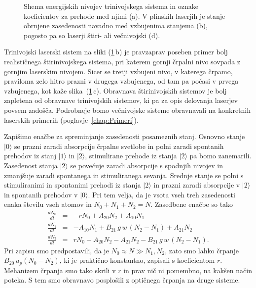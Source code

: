 \begin{figure}[h]
\centering
\def\svgwidth{130truemm} 

\caption{Shema energijskih nivojev trinivojskega sistema in oznake koeficientov za prehode
med njimi (a). V plinskih laserjih je stanje obrnjene zasedenosti navadno med vzbujenima 
stanjema (b), pogosto pa so laserji štiri- ali večnivojski (d).}
\label{fig:3nivojski}
\end{figure}
\begin{remark}
Trinivojski laserski sistem na sliki (\ref{fig:3nivojski}\,b) je pravzaprav 
poseben primer bolj realističnega štirinivojskega sistema, 
pri katerem gornji črpalni nivo sovpada z gornjim laserskim nivojem. Sicer se tretji vzbujeni nivo, 
v katerega črpamo, praviloma zelo hitro prazni v drugega vzbujenega, od tam pa počasi v prvega vzbujenega, 
kot kaže slika~(\ref{fig:3nivojski}\,c).
Obravnava štirinivojskih sistemov je bolj zapletena od obravnave trinivojskih sistemov, 
ki pa za opis delovanja laserjev povsem zadošča. Podrobneje bomo večnivojske sisteme 
obravnavali na konkretnih laserskih primerih (poglavje~\ref{chap:Primeri}).
\end{remark}

Zapišimo enačbe za spreminjanje zasedenosti posameznih stanj. Osnovno stanje
$|0\rangle$ se prazni zaradi absorpcije črpalne svetlobe in polni zaradi
spontanih prehodov iz stanj $|1\rangle$ in $|2\rangle$, stimulirane
prehode iz stanja $|2\rangle$ pa bomo zanemarili. Zasedenost stanja $|2\rangle$ se
povečuje zaradi absorpcije s spodnjih nivojev in zmanjšuje
zaradi spontanega in stimuliranega sevanja. Srednje stanje se polni
s stimuliranimi in spontanimi prehodi iz stanja $|2\rangle$ in prazni
zaradi absorpcije v $|2\rangle$ in spontanih prehodov v $|0\rangle$.
Pri tem velja, da je vsota vseh treh zasedenosti enaka številu vseh atomov in $N_{0}+N_{1}+N_{2}=N$. 
Zasedbene enačbe so tako
\begin{eqnarray}
\frac{dN_{0}}{dt} & = & -rN_0+A_{20}N_{2}+A_{10}N_{1} \label{4.39.1}\\
\frac{dN_{1}}{dt} & = & -A_{10}N_{1}+B_{21}\,g\,w\, (N_{2}-N_{1})+A_{21}N_{2} \label{4.39.2}\\
\frac{dN_{2}}{dt} & = & rN_0-A_{20}N_{2}-A_{21}N_{2}-B_{21}\,g\,w\, (N_2-N_1).
\label{4.39}
\end{eqnarray}
Pri zapisu smo predpostavili, da je $N_0 \approx N \gg N_1, N_2$, zato smo lahko črpanje $B_{20}\, 
u_{p} (N_0-N_2)$, ki je praktično konstantno, zapisali s koeficientom $r$. Mehanizem črpanja 
smo tako skrili v $r$ in prav nič ni pomembno, na kakšen način poteka.
S tem smo obravnavo posplošili z optičnega črpanja na druge sisteme. 

